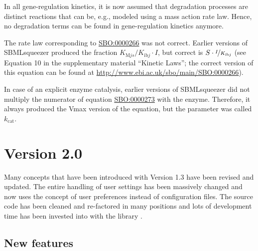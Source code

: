 In all gene-regulation kinetics, it is now assumed that degradation processes
are distinct reactions that can be, e.g., modeled using a mass action rate law.
Hence, no degradation terms can be found in gene-regulation kinetics anymore.

The rate law corresponding to
\href{identifiers.org/biomodels.sbo/SBO:0000266}{SBO:0000266} was not correct.
Earlier versions of SBMLsqueezer produced the fraction $K_{\mathrm{M}js}/K_{\mathrm{ib}j}\cdot I$, but
correct is $S\cdot\nicefrac{I}{K_{\mathrm{ib}j}}$ (see Equation 10 in the supplementary material ``Kinetic
Laws''; the correct version of this equation can be found at
\url{http://www.ebi.ac.uk/sbo/main/SBO:0000266}).

In case of an explicit enzyme catalysis, earlier versions of SBMLsqueezer did not
multiply the numerator of equation
\href{identifiers.org/biomodels.sbo/SBO:0000273}{SBO:0000273} with the enzyme.
Therefore, it always produced the Vmax version of the equation, but the parameter
was called $k_\mathrm{cat}$.


\section{Version 2.0}

Many concepts that have been introduced with Version 1.3 have been revised and
updated. The entire handling of user settings has been massively changed and now
uses the concept of user preferences instead of configuration files. The source
code has been cleaned and re-factored in many positions and lots of development
time has been invested into with the library \JSBML.

\subsection{New features}

